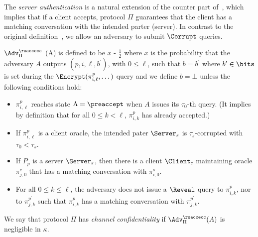 \begin{remark}
 The \textit{server authentication}  is a natural extension of the counter part of~\cite{KPW13:SACCE},
 which implies that if a client accepts, protocol $\Pi$ guarantees that the client has a matching conversation with
 the intended parter (server). In contrast to the original definition~\cite{KPW13:SACCE},
 we allow an adversary to submit $\Corrupt$ queries.
 \end{remark}

\begin{definition} \label{def:rsacce-cc}
 $\Adv^{\rsaccecc}_{\Pi}$ (A) is defined to be $x$ - $\frac{1}{2}$ where $x$ is the probability that the adversary $A$ outputs $(p, i, \ell, b^{\prime})$, with $0\leq \ell$,
 such that $b = b^{\prime}$ where $b^{\prime} \in \bits$ is set during the $\Encrypt(\pi^p_{i,\ell},\dots)$ query and we define $b=\bot$ unless the following conditions hold:
 \begin{itemize}
  \item{$\pi^p_{i,\ell}$ reaches state $\Lambda=\preaccept$ when $A$ issues
  its $\tau_0$-th query. (It implies by definition that for all $0\leq k < \ell$,
  $\pi^p_{i,k}$ has already accepted.)}

  \item{If $\pi^p_{i,\ell}$ is a client oracle,
  the intended pater $\Server_s$ is $\tau_s$-corrupted with $\tau_0 < \tau_s$. }

  \item{If $P_p$ is a server $\Server_s$, then
  there is a client $\Client_c$ maintaining oracle $\pi^c_{j,0}$ that has a matching
  conversation with $\pi^s_{i,0}$.}

  \item{For all $0\leq k \leq \ell$, the adversary does not issue a $\Reveal$ query to
  $\pi^p_{i,k}$, nor to $\pi^{p^{\prime}}_{j,k}$ such that $\pi^p_{i,k}$ has a matching conversation
  with $\pi^{p^{\prime}}_{j,k}$.}

 \end{itemize}
 We say that protocol $\Pi$ has \textit{channel confidentiality}
 if $\Adv^{\rsaccecc}_{\Pi}(A)$ is negligible in $\kappa$.
\end{definition}

